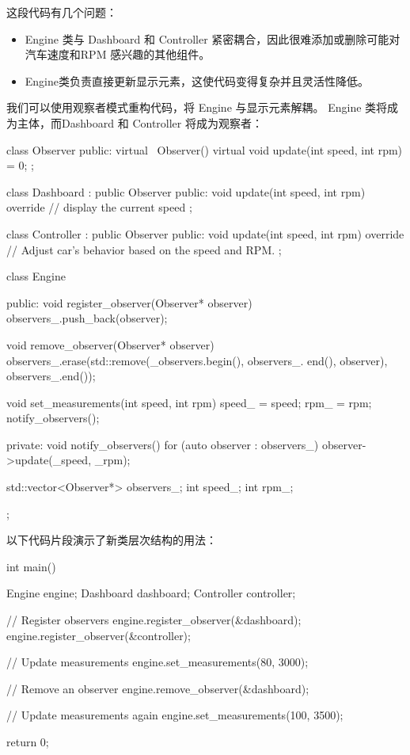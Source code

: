 这段代码有几个问题：

\begin{itemize}
\item
Engine 类与 Dashboard 和 Controller 紧密耦合，因此很难添加或删除可能对汽车速度和RPM 感兴趣的其他组件。

\item
Engine类负责直接更新显示元素，这使代码变得复杂并且灵活性降低。
\end{itemize}

我们可以使用观察者模式重构代码，将 Engine 与显示元素解耦。 Engine 类将成为主体，而Dashboard 和 Controller 将成为观察者：

\begin{cpp}
class Observer {
public:
    virtual ~Observer() {}
    virtual void update(int speed, int rpm) = 0;
};

class Dashboard : public Observer {
public:
    void update(int speed, int rpm) override {
        // display the current speed
    }
};

class Controller : public Observer {
public:
    void update(int speed, int rpm) override {
        // Adjust car's behavior based on the speed and RPM.
    }
};

class Engine {
public:
    void register_observer(Observer* observer) {
        observers_.push_back(observer);
    }

    void remove_observer(Observer* observer) {
        observers_.erase(std::remove(_observers.begin(), observers_.
        end(), observer), observers_.end());
    }

    void set_measurements(int speed, int rpm) {
        speed_ = speed;
        rpm_ = rpm;
        notify_observers();
    }

private:
    void notify_observers() {
        for (auto observer : observers_) {
            observer->update(_speed, _rpm);
        }
    }

    std::vector<Observer*> observers_;
    int speed_;
    int rpm_;
};
\end{cpp}

以下代码片段演示了新类层次结构的用法：

\begin{cpp}
int main() {
    Engine engine;
    Dashboard dashboard;
    Controller controller;

    // Register observers
    engine.register_observer(&dashboard);
    engine.register_observer(&controller);

    // Update measurements
    engine.set_measurements(80, 3000);

    // Remove an observer
    engine.remove_observer(&dashboard);

    // Update measurements again
    engine.set_measurements(100, 3500);

    return 0;
}
\end{cpp}

